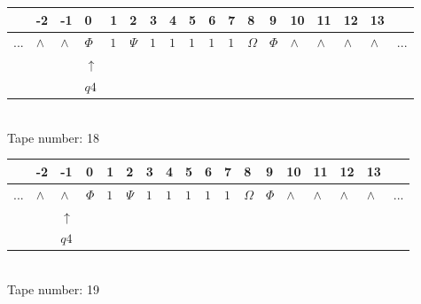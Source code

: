 \documentclass[11pt]{article}
\begin{document}
\begin{table}[H]
\centering
\begin{tabular}{llllllllllllllllll}
 & -2 & -1 & 0 & 1 & 2 & 3 & 4 & 5 & 6 & 7 & 8 & 9 & 10 & 11 & 12 & 13 & \\
\hline
$...$ & \multicolumn{1}{|l|}{$\wedge$} & \multicolumn{1}{|l|}{$\wedge$} & \multicolumn{1}{|l|}{$\Phi$} & \multicolumn{1}{|l|}{$1$} & \multicolumn{1}{|l|}{$\Psi$} & \multicolumn{1}{|l|}{$1$} & \multicolumn{1}{|l|}{$1$} & \multicolumn{1}{|l|}{$1$} & \multicolumn{1}{|l|}{$1$} & \multicolumn{1}{|l|}{$1$} & \multicolumn{1}{|l|}{$\Omega$} & \multicolumn{1}{|l|}{$\Phi$} & \multicolumn{1}{|l|}{$\wedge$} & \multicolumn{1}{|l|}{$\wedge$} & \multicolumn{1}{|l|}{$\wedge$} & \multicolumn{1}{|l|}{$\wedge$} & $...$\\
\hline
&  &  & $\uparrow$ &  &  &  &  &  &  &  &  &  &  &  &  &  &  \\
&  &  & $ q4 $ &  &  &  &  &  &  &  &  &  &  &  &  &  &  \\
\end{tabular}
\\
Tape number: 18
\noindent\makebox[\linewidth]{\hdashrule{\textwidth}{1pt}{1pt}}\end{table}

\begin{table}[H]
\centering
\begin{tabular}{llllllllllllllllll}
 & -2 & -1 & 0 & 1 & 2 & 3 & 4 & 5 & 6 & 7 & 8 & 9 & 10 & 11 & 12 & 13 & \\
\hline
$...$ & \multicolumn{1}{|l|}{$\wedge$} & \multicolumn{1}{|l|}{$\wedge$} & \multicolumn{1}{|l|}{$\Phi$} & \multicolumn{1}{|l|}{$1$} & \multicolumn{1}{|l|}{$\Psi$} & \multicolumn{1}{|l|}{$1$} & \multicolumn{1}{|l|}{$1$} & \multicolumn{1}{|l|}{$1$} & \multicolumn{1}{|l|}{$1$} & \multicolumn{1}{|l|}{$1$} & \multicolumn{1}{|l|}{$\Omega$} & \multicolumn{1}{|l|}{$\Phi$} & \multicolumn{1}{|l|}{$\wedge$} & \multicolumn{1}{|l|}{$\wedge$} & \multicolumn{1}{|l|}{$\wedge$} & \multicolumn{1}{|l|}{$\wedge$} & $...$\\
\hline
&  & $\uparrow$ &  &  &  &  &  &  &  &  &  &  &  &  &  &  &  \\
&  & $ q4 $ &  &  &  &  &  &  &  &  &  &  &  &  &  &  &  \\
\end{tabular}
\\
Tape number: 19
\noindent\makebox[\linewidth]{\hdashrule{\textwidth}{1pt}{1pt}}\end{table}
\end{document}
